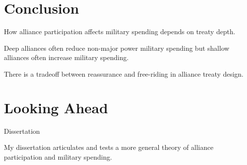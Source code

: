 \documentclass[12pt]{beamer}
\begin{document}

\section{Conclusion}


\begin{frame}[standout]

How alliance participation affects military spending depends on treaty depth.  

\end{frame}

 \begin{frame}[standout]

Deep alliances often reduce non-major power military spending but shallow alliances often increase military spending. 

 \end{frame}
 
 
 \begin{frame}[standout]

There is a tradeoff between reassurance and free-riding in alliance treaty design. 

 \end{frame}



\section{Looking Ahead}


\begin{frame}{Dissertation}

My dissertation articulates and tests a more general theory of alliance participation and military spending. 

\end{frame}


\end{document}
